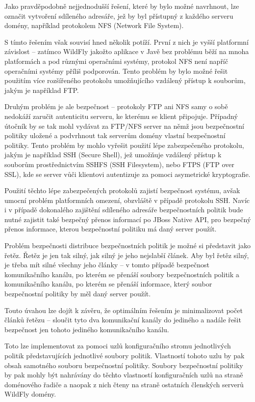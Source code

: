 Jako pravděpodobně nejjednodušší řešení, které by bylo možné navrhnout, lze označit vytvoření sdíleného adresáře, jež by byl přístupný z každého serveru domény, například protokolem NFS (Network File System).

S tímto řešením však souvisí hned několik potíží. První z nich je vyšší platformní závislost -- zatímco WildFly jakožto aplikace v Javě bez problému běží na mnoha platformách a pod různými operačními systémy, protokol NFS není napříč operačními systémy příliš podporován. Tento problém by bylo možné řešit použitím více rozšířeného protokolu umožňujícího vzdálený přístup k souborům, jakým je například FTP.

Druhým problém je ale bezpečnost -- protokoly FTP ani NFS samy o sobě nedokáží zaručit autenticitu serveru, ke kterému se klient připojuje. Případný útočník by se tak mohl vydávat za FTP/NFS server na němž jsou bezpečnostní politiky uložené a podvrhnout tak serverům domény vlastní bezpečnostní politiky. Tento problém by mohlo vyřešit použití lépe zabezpečeného protokolu, jakým je například SSH (Secure Shell), jež umožňuje vzdálený přístup k souborům prostřednictvím SSHFS (SSH Filesystem), nebo FTPS (FTP over SSL), kde se server vůči klientovi autentizuje za pomoci asymetrické kryptografie. \cite[3]{ssh}

Použití těchto lépe zabezpečených protokolů zajistí bezpečnost systému, avšak umocní problém platformních omezení, obzvláště v případě protokolu SSH. Navíc i v případě dokonalého zajištění sdíleného adresáře bezpečnostních politik bude nutné zajistit také bezpečný přenos informací po JBoss Native API, pro bezpečný přenos informace, kterou bezpečnostní politiku má daný server použít.

Problém bezpečnosti distribuce bezpečnostních politik je možné si představit jako řetěz. Řetěz je jen tak silný, jak silný je jeho nejslabší článek. Aby byl řetěz silný, je třeba mít silné všechny jeho články -- v tomto případě bezpečnost komunikačního kanálu, po kterém se přenáší soubory bezpečnostních politik a komunikačního kanálu, po kterém se přenáší informace, který soubor bezpečnostní politiky by měl daný server použít.

Touto úvahou lze dojít k závěru, že optimálním řešením je minimalizovat počet článků řetězu -- sloučit tyto dva komunikační kanály do jediného a nadále řešit bezpečnost jen tohoto jediného komunikačního kanálu.

Toto lze implementovat za pomoci uzlů konfiguračního stromu jednotlivých politik představujících jednotlivé soubory politik. Vlastností tohoto uzlu by pak obsah samotného souboru bezpečnostní politiky. Soubory bezpečnostní politiky by pak mohly být nahrávány do těchto vlastností konfiguračních uzlů na straně doménového řadiče a naopak z nich čteny na straně ostatních členských serverů WildFly domény.

